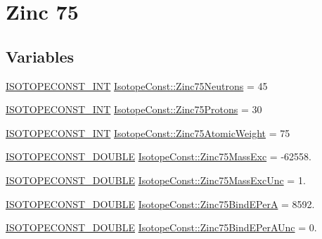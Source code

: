 \hypertarget{group___isotope_const-_zinc-_zn75}{}\section{Zinc 75}
\label{group___isotope_const-_zinc-_zn75}
\subsection*{Variables}
\begin{DoxyCompactItemize}
\item 
\mbox{\hyperlink{group___isotope_const-_macros_ga5f18360b3e99483a35c32d789e62621c}{I\+S\+O\+T\+O\+P\+E\+C\+O\+N\+S\+T\+\_\+\+I\+NT}} \mbox{\hyperlink{group___isotope_const-_zinc-_zn75_gaf4a5436404e40c41ae3d37237eaf63a0}{Isotope\+Const\+::\+Zinc75\+Neutrons}} = 45
\item 
\mbox{\hyperlink{group___isotope_const-_macros_ga5f18360b3e99483a35c32d789e62621c}{I\+S\+O\+T\+O\+P\+E\+C\+O\+N\+S\+T\+\_\+\+I\+NT}} \mbox{\hyperlink{group___isotope_const-_zinc-_zn75_ga18699b1d6b5223ce87e48ddac69e6cf9}{Isotope\+Const\+::\+Zinc75\+Protons}} = 30
\item 
\mbox{\hyperlink{group___isotope_const-_macros_ga5f18360b3e99483a35c32d789e62621c}{I\+S\+O\+T\+O\+P\+E\+C\+O\+N\+S\+T\+\_\+\+I\+NT}} \mbox{\hyperlink{group___isotope_const-_zinc-_zn75_ga81110788e0255448a490722f9f8f960e}{Isotope\+Const\+::\+Zinc75\+Atomic\+Weight}} = 75
\item 
\mbox{\hyperlink{group___isotope_const-_macros_ga8f45a7272ce02c0b4c65c44636ed719a}{I\+S\+O\+T\+O\+P\+E\+C\+O\+N\+S\+T\+\_\+\+D\+O\+U\+B\+LE}} \mbox{\hyperlink{group___isotope_const-_zinc-_zn75_ga7a6ef78639c9dc987a0a4fc28104b299}{Isotope\+Const\+::\+Zinc75\+Mass\+Exc}} = -\/62558.
\item 
\mbox{\hyperlink{group___isotope_const-_macros_ga8f45a7272ce02c0b4c65c44636ed719a}{I\+S\+O\+T\+O\+P\+E\+C\+O\+N\+S\+T\+\_\+\+D\+O\+U\+B\+LE}} \mbox{\hyperlink{group___isotope_const-_zinc-_zn75_gacac609c137a23691bb436a17c22ef164}{Isotope\+Const\+::\+Zinc75\+Mass\+Exc\+Unc}} = 1.
\item 
\mbox{\hyperlink{group___isotope_const-_macros_ga8f45a7272ce02c0b4c65c44636ed719a}{I\+S\+O\+T\+O\+P\+E\+C\+O\+N\+S\+T\+\_\+\+D\+O\+U\+B\+LE}} \mbox{\hyperlink{group___isotope_const-_zinc-_zn75_ga10d757ab5b0612f345623bad2d0161b0}{Isotope\+Const\+::\+Zinc75\+Bind\+E\+PerA}} = 8592.
\item 
\mbox{\hyperlink{group___isotope_const-_macros_ga8f45a7272ce02c0b4c65c44636ed719a}{I\+S\+O\+T\+O\+P\+E\+C\+O\+N\+S\+T\+\_\+\+D\+O\+U\+B\+LE}} \mbox{\hyperlink{group___isotope_const-_zinc-_zn75_ga5b0b7ba931575d7a9e82a5b63d66b62f}{Isotope\+Const\+::\+Zinc75\+Bind\+E\+Per\+A\+Unc}} = 0.

\end{DoxyCompactItemize}
